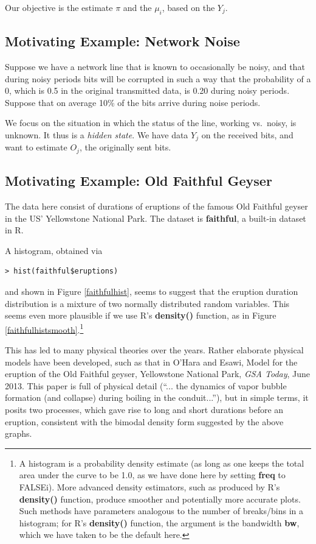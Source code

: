 \documentclass[11pt]{article}
\begin{document}
Our objective is the estimate $\pi$ and the $\mu_i$, based on the $Y_j$.  

\subsection{Motivating Example:  Network Noise}

Suppose we have a network line that is known to occasionally be
noisy, and that during noisy periods bits will be corrupted in such
a way that the probability of a 0, which is 0.5 in the original
transmitted data, is 0.20 during noisy periods.  Suppose that on average
10\% of the bits arrive during noise periods.

We focus on the situation in which the status of the line, working vs.\
noisy, is unknown.  It thus is a \textit{hidden state}.  We have data
$Y_j$ on the received bits, and want to estimate $O_j$, the originally
sent bits.

\subsection{Motivating Example:  Old Faithful Geyser}

The data here consist of durations of eruptions of the famous
Old Faithful geyser in the US' Yellowstone National Park.  The dataset
is \textbf{faithful}, a built-in dataset in R.

A histogram, obtained via 

\begin{lstlisting}
> hist(faithful$eruptions)
\end{lstlisting}

and shown in Figure \ref{faithfulhist}, seems to suggest that the
eruption duration distribution is a mixture of two normally distributed random
variables.  This seems even more plausible if we use R's 
\textbf{density()} function, as in Figure
\ref{faithfulhistsmooth}.\footnote{A histogram is a probability density
estimate (as long as one keeps the total area under the curve to be 1.0,
as we have done here by setting \textbf{freq} to FALSEi).  More advanced
density estimators, such as produced by R's \textbf{density()} function,
produce smoother and potentially more accurate plots.  Such methods have
parameters analogous to the number of breaks/bins in a histogram; for
R's \textbf{density()} function, the argument is the bandwidth
\textbf{bw}, which we have taken to be the default here.}

This has led to many physical theories over the years.  Rather elaborate
physical models have been developed, such as that in O'Hara and Esawi,
Model for the eruption of the Old Faithful geyser, Yellowstone National
Park, \textit{GSA Today}, June 2013.  This paper is full of physical
detail (``... the dynamics of vapor bubble formation (and collapse)
during boiling in the conduit...''), but in simple terms, it posits two
processes, which gave rise to long and short durations before an
eruption, consistent with the bimodal density form suggested by the
above graphs.
\end{document}
